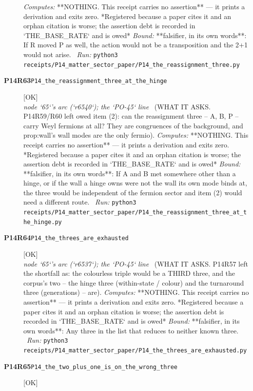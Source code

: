\begin{description}
\emph{Computes:}  **NOTHING. This receipt carries no assertion** --- it prints a derivation and exits zero. *Registered because a paper cites it and an orphan citation is worse; the assertion debt is recorded in `THE\_BASE\_RATE` and is owed*
 \emph{Bound:} **falsifier, in its own words**: If R moved P as well, the action would not be a transposition and the 2+1 would not arise.
\ \emph{Run:} \texttt{python3 receipts/P14\_matter\_sector\_paper/P14\_the\_reassignment\_three.py}
\item[\rcptlabel{P14_the_reassignment_three_at_the_hinge}{P14R63}\textbf{P14R63}\quad\texttt{P14\_the\_reassignment\_three\_at\_the\_hinge}]\hfill\textsf{[OK]}\\
\textit{node `65`'s arc (`r6540`); the `PO-45` line} \ (WHAT IT ASKS. P14R59/R60 left owed item (2): can the reassignment three -- A, B, P -- carry Weyl fermions at all? They are congruences of the background, and prop:wall's wall modes are the only fermio). 
\emph{Computes:}  **NOTHING. This receipt carries no assertion** --- it prints a derivation and exits zero. *Registered because a paper cites it and an orphan citation is worse; the assertion debt is recorded in `THE\_BASE\_RATE` and is owed*
 \emph{Bound:} **falsifier, in its own words**: If A and B met somewhere other than a hinge, or if the wall a hinge owns were not the wall its own mode binds at, the three would be independent of the fermion sector and item (2) would need a different route.
\ \emph{Run:} \texttt{python3 receipts/P14\_matter\_sector\_paper/P14\_the\_reassignment\_three\_at\_the\_hinge.py}
\item[\rcptlabel{P14_the_threes_are_exhausted}{P14R64}\textbf{P14R64}\quad\texttt{P14\_the\_threes\_are\_exhausted}]\hfill\textsf{[OK]}\\
\textit{node `65`'s arc (`r6537`); the `PO-45` line} \ (WHAT IT ASKS. P14R57 left the shortfall as: the colourless triple would be a THIRD three, and the corpus's two -- the hinge three (within-state / colour) and the turnaround three (generations) -- are). 
\emph{Computes:}  **NOTHING. This receipt carries no assertion** --- it prints a derivation and exits zero. *Registered because a paper cites it and an orphan citation is worse; the assertion debt is recorded in `THE\_BASE\_RATE` and is owed*
 \emph{Bound:} **falsifier, in its own words**: Any three in the list that reduces to neither known three.
\ \emph{Run:} \texttt{python3 receipts/P14\_matter\_sector\_paper/P14\_the\_threes\_are\_exhausted.py}
\item[\rcptlabel{P14_the_two_plus_one_is_on_the_wrong_three}{P14R65}\textbf{P14R65}\quad\texttt{P14\_the\_two\_plus\_one\_is\_on\_the\_wrong\_three}]\hfill\textsf{[OK]}\\

\end{description}

